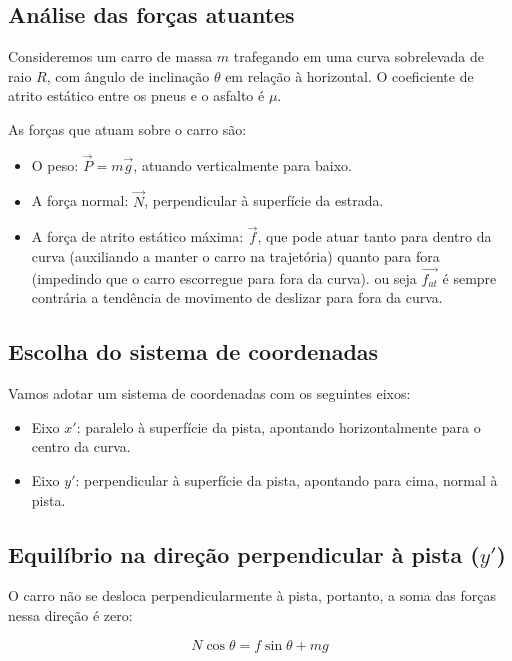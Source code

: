 \documentclass[a4paper,12pt]{article}
\begin{document}
\begin{flushleft}
\subsection*{Análise das forças atuantes}

Consideremos um carro de massa \( m \) trafegando em uma curva sobrelevada de raio \( R \), com ângulo de inclinação \(\theta\) em relação à horizontal. O coeficiente de atrito estático entre os pneus e o asfalto é \(\mu\).

As forças que atuam sobre o carro são:

\begin{itemize}
  \item O peso: \( \vec{P} = m\vec{g} \), atuando verticalmente para baixo.
  \item A força normal: \( \vec{N} \), perpendicular à superfície da estrada.
  \item A força de atrito estático máxima: \( \vec{f} \), que pode atuar tanto para dentro da curva (auxiliando a manter o carro na trajetória) quanto para fora (impedindo que o carro escorregue para fora da curva).
  ou seja \( \vec{f_{at}} \) \'e sempre contr\'aria a tend\^encia de movimento de deslizar para fora da curva.
\end{itemize}

\subsection*{Escolha do sistema de coordenadas}

Vamos adotar um sistema de coordenadas com os seguintes eixos:

\begin{itemize}
  \item Eixo \( x' \): paralelo à superfície da pista, apontando horizontalmente para o centro da curva.
  \item Eixo \( y' \): perpendicular à superfície da pista, apontando para cima, normal à pista.
\end{itemize}

\subsection*{Equilíbrio na direção perpendicular à pista (\( y' \))}

O carro não se desloca perpendicularmente à pista, portanto, a soma das forças nessa direção é zero:

\begin{equation}
N \cos\theta = f \sin\theta + mg
\label{eq:equilibrio_y}
\end{equation}


\end{flushleft}
\end{document}
